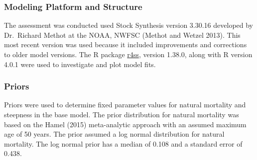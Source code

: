 \documentclass[11pt,
  english,
  a4paper,
]{article}
\begin{document}
\leavevmode\tagmcend\tagstructend\par


\hypertarget{modeling-platform-and-structure}{%
\subsubsection{Modeling Platform and Structure}\label{modeling-platform-and-structure}}

\leavevmode\tagmcend\tagstructend


The assessment was conducted used Stock Synthesis version 3.30.16 developed by Dr.~Richard Methot at the NOAA, NWFSC {(Methot and Wetzel 2013)\leavevmode\tagmcend\tagstructend}. This most recent version was used because it included improvements and corrections to older model versions. The R package {\href{https://github.com/r4ss/r4ss}{r4ss}\leavevmode\tagmcend\tagstructend}, version 1.38.0, along with R version 4.0.1 were used to investigate and plot model fits.

\leavevmode\tagmcend\tagstructend\par


\hypertarget{priors}{%
\subsubsection{Priors}\label{priors}}

\leavevmode\tagmcend\tagstructend


Priors were used to determine fixed parameter values for natural mortality and steepness in the base model. The prior distribution for natural mortality was based on the Hamel {(2015)\leavevmode\tagmcend\tagstructend} meta-analytic approach with an assumed maximum age of 50 years. The prior assumed a log normal distribution for natural mortality. The log normal prior has a median of 0.108 and a standard error of 0.438.

\leavevmode\tagmcend\tagstructend\par

\end{document}
